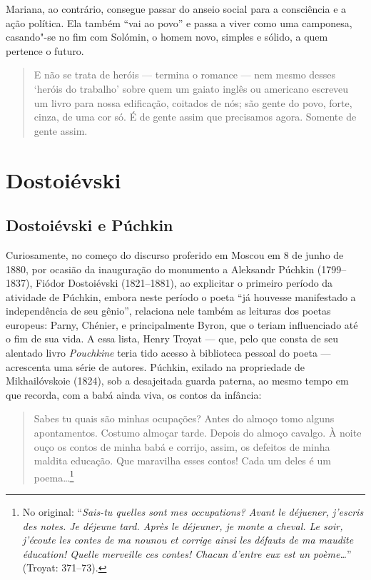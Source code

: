 Mariana, ao contrário, consegue passar do anseio social para a
consciência e a ação política. Ela também ``vai ao povo'' e passa a
viver como uma camponesa, casando"-se no fim com Solómin, o homem novo,
simples e sólido, a quem pertence o futuro.

\begin{quote}
E não se trata de heróis --- termina o romance --- nem mesmo desses
`heróis do trabalho' sobre quem um gaiato inglês ou americano escreveu
um livro para nossa edificação, coitados de nós; são gente do povo,
forte, cinza, de uma cor só. É de gente assim que precisamos agora.
Somente de gente assim.
\end{quote}


\part{Dostoiévski}

\chapter{Dostoiévski e Púchkin}

Curiosamente, no começo do discurso proferido em Moscou em 8 de junho de
1880, por ocasião da inauguração do monumento a Aleksandr Púchkin
(1799--1837), Fiódor Dostoiévski (1821--1881), ao explicitar o primeiro
período da atividade de Púchkin, embora neste período o poeta ``já houvesse
manifestado a independência de seu gênio'', relaciona nele também as
leituras dos poetas europeus: Parny, Chénier, e principalmente Byron,
que o teriam influenciado até o fim de sua vida. A essa lista, Henry
Troyat --- que, pelo que consta de seu alentado livro \emph{Pouchkine}
teria tido acesso à biblioteca pessoal do poeta --- acrescenta uma série
de autores. Púchkin, exilado na propriedade de Mikhailóvskoie (1824), sob a
desajeitada guarda paterna, ao mesmo tempo em que recorda, com a babá
ainda viva, os contos da infância:

\begin{quote}
Sabes tu quais são minhas ocupações? Antes do almoço tomo alguns
apontamentos. Costumo almoçar tarde. Depois do almoço cavalgo. À noite
ouço os contos de minha babá e corrijo, assim, os defeitos de minha
maldita educação. Que maravilha esses contos! Cada um deles é um
poema\ldots{}\footnote{No original: ``\emph{Sais-tu quelles sont mes
  occupations? Avant le déjuener, j'escris des notes. Je déjeune tard.
  Après le déjeuner, je monte a cheval. Le soir, j'écoute les contes de
  ma nounou et corrige ainsi les défauts de ma maudite éducation! Quelle
  merveille ces contes! Chacun d'entre eux est un poème\ldots{}}'' (Troyat: 371--73).}
\end{quote}


